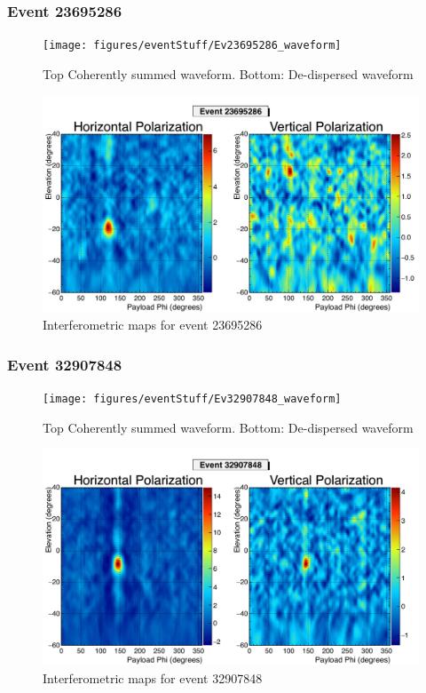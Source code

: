 		\subsubsection{Event 23695286}
		\begin{figure}
		\centering
			\texttt{[image: figures/eventStuff/Ev23695286\_waveform]}
			\caption{Top Coherently summed waveform.  Bottom: De-dispersed waveform} 
		\label{fig:Ev23695286_waveform}
		\end{figure}
		
		\begin{figure}
		\centering
			\includegraphics[width=\textwidth]{figures/intMap/intMap_ev23695286}
			\caption{Interferometric maps for event 23695286} 
		\label{fig:Ev23695286_map}
		\end{figure}			
	
		\subsubsection{Event 32907848}
		\begin{figure}
		\centering
			\texttt{[image: figures/eventStuff/Ev32907848\_waveform]}
			\caption{Top Coherently summed waveform.  Bottom: De-dispersed waveform} 
		\label{fig:Ev32907848_waveform}
		\end{figure}
		
		\begin{figure}
		\centering
			\includegraphics[width=\textwidth]{figures/intMap/intMap_ev32907848}
			\caption{Interferometric maps for event 32907848} 
		\label{fig:Ev32907848_map}
		\end{figure}	
	
